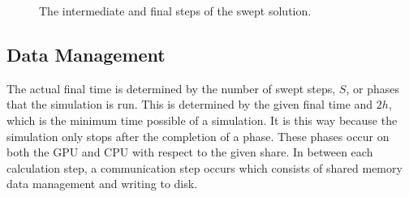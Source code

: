 \documentclass[review]{elsarticle}
\begin{document}
\begin{figure}[!htb]
    \caption{The intermediate and final steps of the swept solution.}
    \label{fig:MainTwo}
\end{figure}

\subsection{Data Management}
The actual final time is determined by the number of swept steps, $S$, or phases that the simulation is run. This is determined by the given final time and $2h$, which is the minimum time possible of a simulation. It is this way because the simulation only stops after the completion of a phase. These phases occur on both the GPU and CPU with respect to the given share. In between each calculation step, a communication step occurs which consists of shared memory data management and writing to disk.
\end{document}
